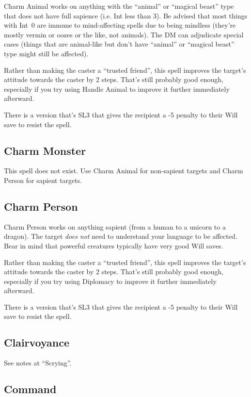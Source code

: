 Charm Animal works on anything with the ``animal'' or ``magical beast''
type that does not have full sapience (i.e. Int less than 3). Be advised
that most things with Int~0 are immune to mind-affecting spells due to
being mindless (they're mostly vermin or oozes or the like, not animals).
The DM can adjudicate special cases (things that are animal-like but don't
have ``animal'' or ``magical beast'' type might still be affected).

Rather than making the caster a ``trusted friend'', this spell improves
the target's attitude towards the caster by 2 steps. That's still probably
good enough, especially if you try using Handle Animal to improve it
further immediately afterward.

There is a version that's SL3 that gives the recipient a -5 penalty to
their Will save to resist the spell.
%

%
\subsection{Charm Monster}

This spell does not exist. Use Charm Animal for non-sapient targets and
Charm Person for sapient targets.
%

%
\subsection{Charm Person}

Charm Person works on anything sapient (from a human to a unicorn to a
dragon). The target \textit{does not} need to understand your language
to be affected. Bear in mind that powerful creatures typically have very
good Will saves.

Rather than making the caster a ``trusted friend'', this spell improves
the target's attitude towards the caster by 2 steps. That's still probably
good enough, especially if you try using Diplomacy to improve it further
immediately afterward.

There is a version that's SL3 that gives the recipient a -5 penalty to
their Will save to resist the spell.
%

%
\subsection{Clairvoyance}

See notes at ``Scrying''.
%

%
\subsection{Command}

